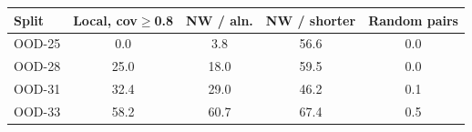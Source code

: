 \begin{tabular}{lcccc}
\toprule
Split & Local, cov$\geq$0.8 & NW / aln. & NW / shorter & Random pairs \\
\midrule
OOD-25 & 0.0 & 3.8 & 56.6 & 0.0 \\
OOD-28 & 25.0 & 18.0 & 59.5 & 0.0 \\
OOD-31 & 32.4 & 29.0 & 46.2 & 0.1 \\
OOD-33 & 58.2 & 60.7 & 67.4 & 0.5 \\
\bottomrule
\end{tabular}
